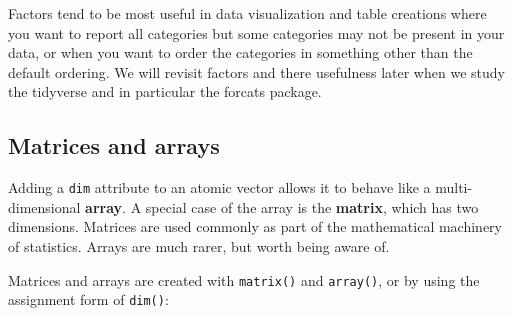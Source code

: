 \documentclass[]{book}
\theoremstyle{definition}
\theoremstyle{definition}
\theoremstyle{definition}
\theoremstyle{remark}
\begin{document}
Factors tend to be most useful in data visualization and table creations
where you want to report all categories but some categories may not be
present in your data, or when you want to order the categories in
something other than the default ordering. We will revisit factors and
there usefulness later when we study the tidyverse and in particular the
forcats package.

\hypertarget{matrices-and-arrays}{%
\subsection{Matrices and arrays}\label{matrices-and-arrays}}

Adding a \texttt{dim} attribute to an atomic vector allows it to behave
like a multi-dimensional \textbf{array}. A special case of the array is
the \textbf{matrix}, which has two dimensions. Matrices are used
commonly as part of the mathematical machinery of statistics. Arrays are
much rarer, but worth being aware of.

Matrices and arrays are created with \texttt{matrix()} and
\texttt{array()}, or by using the assignment form of \texttt{dim()}:
\end{document}
